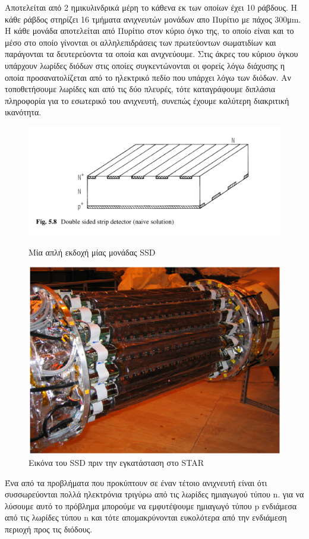 	Αποτελείται από 2 ημικυλινδρικά μέρη το κάθενα εκ των οποίων έχει 10 ράβδους. Η κάθε ράβδος στηρίζει 16 τμήματα ανιχνευτών μονάδων απο Πυρίτιο με πάχος 300μm. Η κάθε μονάδα αποτελείται από Πυρίτιο στον κύριο όγκο της, το οποίο είναι και το μέσο στο οποίο γίνονται οι αλληλεπιδράσεις των πρωτεύοντων σωματιδίων και παράγονται τα δευτερεύοντα τα οποία και ανιχνεύουμε. Στις άκρες του κύριου όγκου υπάρχουν λωρίδες διόδων στις οποίες συγκεντώνονται οι φορείς λόγω διάχυσης η οποία προσανατολίζεται από το ηλεκτρικό πεδίο που υπάρχει λόγω των διόδων. Αν τοποθετήσουμε λωρίδες και από τις δύο πλευρές, τότε  καταγράφουμε διπλάσια πληροφορία για το εσωτερικό του ανιχνευτή, συνεπώς έχουμε καλύτερη διακριτική ικανότητα. 
	
	
	
	\begin{figure}[h!]
	    \centering
	    \begin{minipage}{.5\textwidth}
	        \centering
	        \includegraphics[width=0.9\linewidth, height=0.25\textheight]{STAR_Detectors/SSD_naive}
	        \caption{Μία απλή εκδοχή μίας μονάδας SSD}
	        \label{fig3.19}
	    \end{minipage}%
	    \begin{minipage}{0.5\textwidth}
	        \centering
	        \includegraphics[width=0.9\linewidth, height=0.25\textheight]{STAR_Detectors/SSD_image}
	        \caption{Εικόνα του SSD πριν την εγκατάσταση στο STAR}
	        \label{fig3.20}
	    \end{minipage}
	\end{figure}
	
 	Ένα από τα προβλήματα που προκύπτουν σε έναν τέτοιο ανιχνευτή είναι ότι συσσωρεύονται πολλά ηλεκτρόνια τριγύρω από τις λωρίδες ημιαγωγού τύπου n. για να λύσουμε αυτό το πρόβλημα μπορούμε να εμφυτέψουμε ημιαγωγό τύπου p ενδιάμεσα από τις λωρίδες τύπου n και τότε απομακρύνονται ευκολότερα από την ενδιάμεση περιοχή προς τις διόδους.
 	 
	